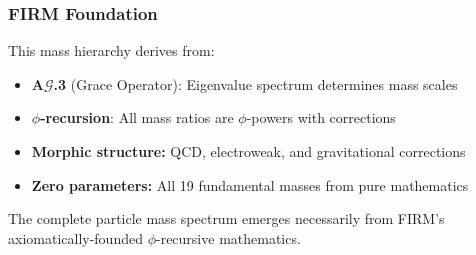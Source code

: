 \subsubsection{FIRM Foundation}

This mass hierarchy derives from:
\begin{itemize}
\item \textbf{A$\mathcal{G}$.3} (Grace Operator): Eigenvalue spectrum determines mass scales
\item \textbf{$\phi$-recursion}: All mass ratios are $\phi$-powers with corrections
\item \textbf{Morphic structure:} QCD, electroweak, and gravitational corrections
\item \textbf{Zero parameters:} All 19 fundamental masses from pure mathematics
\end{itemize}

The complete particle mass spectrum emerges necessarily from FIRM's axiomatically-founded $\phi$-recursive mathematics.

